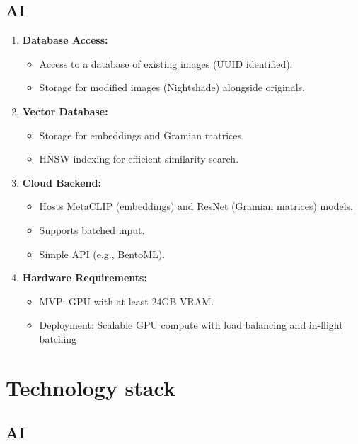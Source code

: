 \section{AI}
\begin{enumerate}
\item \textbf{Database Access:}
    \begin{itemize}
    \item Access to a database of existing images (UUID identified).
    \item Storage for modified images (Nightshade) alongside originals.
    \end{itemize}
\item \textbf{Vector Database:}
    \begin{itemize}
    \item Storage for embeddings and Gramian matrices.
    \item HNSW indexing for efficient similarity search.
    \end{itemize}

\item \textbf{Cloud Backend:}
    \begin{itemize}
    \item Hosts MetaCLIP (embeddings) and ResNet (Gramian matrices) models.
    \item Supports batched input.
    \item Simple API (e.g., BentoML).
    \end{itemize}

\item \textbf{Hardware Requirements:}
    \begin{itemize}
    \item MVP: GPU with at least 24GB VRAM.
    \item Deployment: Scalable GPU compute with load balancing and in-flight batching
    \end{itemize}
\end{enumerate}

\newpage

\chapter{Technology stack}
\section{AI}

